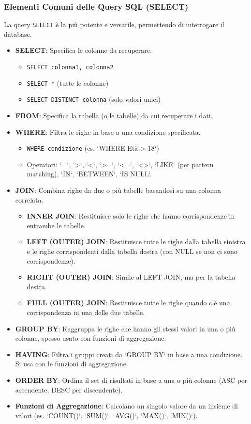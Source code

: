 \subsubsection{Elementi Comuni delle Query SQL (SELECT)}
La query \texttt{SELECT} è la più potente e versatile, permettendo di interrogare il database.
\begin{itemize}
    \item \textbf{SELECT}: Specifica le colonne da recuperare.
    \begin{itemize}
        \item \texttt{SELECT colonna1, colonna2}
        \item \texttt{SELECT *} (tutte le colonne)
        \item \texttt{SELECT DISTINCT colonna} (solo valori unici)
    \end{itemize}
    \item \textbf{FROM}: Specifica la tabella (o le tabelle) da cui recuperare i dati.
    \item \textbf{WHERE}: Filtra le righe in base a una condizione specificata.
    \begin{itemize}
        \item \texttt{WHERE condizione} (es. `WHERE Età > 18`)
        \item Operatori: `=`, `>`, `<`, `>=`, `<=`, `<>`, `LIKE` (per pattern matching), `IN`, `BETWEEN`, `IS NULL`.
    \end{itemize}
    \item \textbf{JOIN}: Combina righe da due o più tabelle basandosi su una colonna correlata.
    \begin{itemize}
        \item \textbf{INNER JOIN}: Restituisce solo le righe che hanno corrispondenze in entrambe le tabelle.
        \item \textbf{LEFT (OUTER) JOIN}: Restituisce tutte le righe dalla tabella sinistra e le righe corrispondenti dalla tabella destra (con NULL se non ci sono corrispondenze).
        \item \textbf{RIGHT (OUTER) JOIN}: Simile al LEFT JOIN, ma per la tabella destra.
        \item \textbf{FULL (OUTER) JOIN}: Restituisce tutte le righe quando c'è una corrispondenza in una delle due tabelle.
    \end{itemize}
    \item \textbf{GROUP BY}: Raggruppa le righe che hanno gli stessi valori in una o più colonne, spesso usato con funzioni di aggregazione.
    \item \textbf{HAVING}: Filtra i gruppi creati da `GROUP BY` in base a una condizione. Si usa con le funzioni di aggregazione.
    \item \textbf{ORDER BY}: Ordina il set di risultati in base a una o più colonne (ASC per ascendente, DESC per discendente).
    \item \textbf{Funzioni di Aggregazione}: Calcolano un singolo valore da un insieme di valori (es. `COUNT()`, `SUM()`, `AVG()`, `MAX()`, `MIN()`).
\end{itemize}

